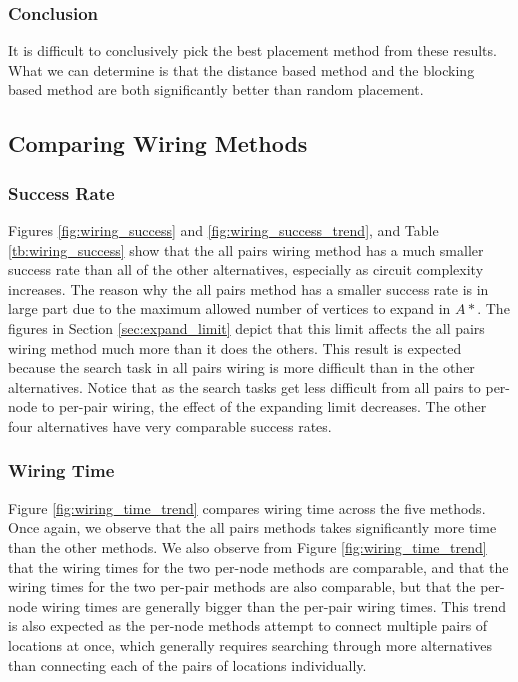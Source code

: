 \subsubsection{Conclusion}
It is difficult to conclusively pick the best placement method from these
results. What we can determine is that the distance based method and the
blocking based method are both significantly better than random placement.

\subsection{Comparing Wiring Methods}

\subsubsection{Success Rate}
Figures \ref{fig:wiring_success} and \ref{fig:wiring_success_trend}, and Table
\ref{tb:wiring_success} show that the all pairs wiring method has a much smaller
success rate than all of
the other alternatives, especially as circuit complexity increases. The reason
why the all pairs method has a smaller success rate is in
large part due to the maximum allowed number of vertices to expand in $A*$. The
figures in Section \ref{sec:expand_limit} depict that this limit affects
the all pairs wiring method much more than it does the others. This result is
expected because the search task in all pairs wiring is more difficult than in
the other alternatives. Notice that as the search tasks get less difficult from
all pairs to per-node to per-pair wiring, the effect of the expanding limit
decreases. The other four alternatives have very comparable success rates.

\subsubsection{Wiring Time}
Figure \ref{fig:wiring_time_trend} compares wiring time across
the five methods. Once again, we observe that the all pairs methods takes
significantly more time than the other methods. We also observe from Figure
\ref{fig:wiring_time_trend} that the wiring times for the two per-node methods
are comparable, and that the wiring times for the two per-pair methods are also
comparable, but that the per-node wiring times are generally bigger than the
per-pair wiring times. This trend is also expected as the per-node methods
attempt to connect multiple pairs of locations at once, which generally requires
searching through more alternatives than
connecting each of the pairs of locations individually.


